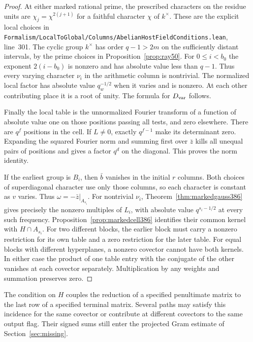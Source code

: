 \documentclass[a4paper,11pt]{article}
\theoremstyle{definition}
\theoremstyle{remark}
\newcommand{\srcloc}[2]{{\small\nolinkurl{#1.lean}}, line~#2}
\numberwithin{equation}{section}
\begin{document}
\begin{proof}
At either marked rational prime, the prescribed characters on the
residue units are \(\chi_j=\chi^{2(j+1)}\) for a faithful character
\(\chi\) of \(k^\times\). These are the explicit local choices in
\srcloc{Formalism/LocalToGlobal/Columns/AbelianHostFieldConditions}{301}.
The cyclic group \(k^\times\) has order \(q-1>2m\) on the
sufficiently distant intervals, by the prime choices in
Proposition~\ref{prop:ray50}. For \(0\le i<b_0\) the exponent
\(2(i-b_0)\) is nonzero and has absolute value less than
\(q-1\). Thus every varying character \(\nu_i\) in the
arithmetic column is nontrivial. The normalized local factor
has absolute value \(q_w^{-1/2}\) when it varies and is
nonzero. At each other contributing place it is a root of
unity. The formula for \(D_{\rm var}\) follows.

Finally the local table is the unnormalized Fourier transform
of a function of absolute value one on those positions passing
all tests, and zero elsewhere. There are \(q^f\) positions in
the cell. If \(L\ne0\), exactly \(q^{f-1}\) make its determinant
zero. Expanding the squared Fourier norm and summing first
over \(\bar z\) kills all unequal pairs of positions and gives
a factor \(q^d\) on the diagonal. This proves the norm identity.

If the earliest group is \(B_i\), then \(\bar b\) vanishes
in the initial \(r\) columns. Both choices of superdiagonal
character use only those columns, so each character is constant
as \(v\) varies. Thus \(\omega=-\bar z|_{A_{s_i}}\). For
nontrivial \(\nu_i\), Theorem~\ref{thm:markedgauss386}
gives precisely the nonzero multiples of \(L_i\), with
absolute value \(q^{s_i-1/2}\) at every such frequency.
Proposition~\ref{prop:markedcell386} identifies their
common kernel with \(H\cap A_{s_i}\).
For two different blocks, the earlier block must carry a
nonzero restriction for its own table and a zero restriction
for the later table. For equal blocks with different
hyperplanes, a nonzero covector cannot have both kernels.
In either case the product of one table entry with the
conjugate of the other vanishes at each covector separately.
Multiplication by any weights and summation preserves zero.
\end{proof}

The condition on \(H\) couples the reduction of a specified
penultimate matrix to the last row of a specified terminal
matrix. Several paths may satisfy this incidence for the same
covector or contribute at different covectors to the same
output flag. Their signed sums still enter the projected
Gram estimate of Section~\ref{sec:missing}.
\end{document}
